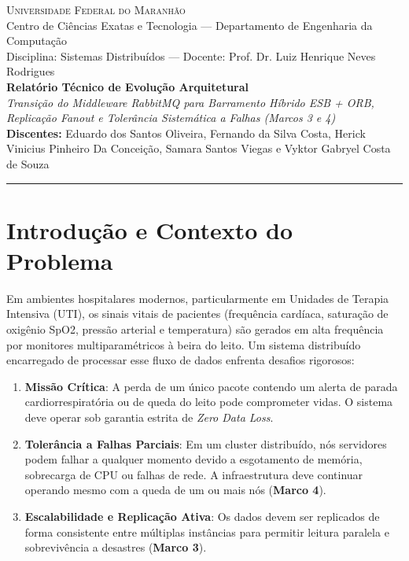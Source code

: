 \documentclass[11pt,a4paper]{article}
\begin{document}
\begin{center}
    {\large \textsc{Universidade Federal do Maranhão}}\\[1pt]
    {\small Centro de Ciências Exatas e Tecnologia — Departamento de Engenharia da Computação}\\[2pt]
    {\small Disciplina: Sistemas Distribuídos — Docente: Prof. Dr. Luiz Henrique Neves Rodrigues}\\[8pt]
    
    {\Large \textbf{Relatório Técnico de Evolução Arquitetural}}\\[3pt]
    {\large \textit{Transição do Middleware RabbitMQ para Barramento Híbrido ESB + ORB, Replicação Fanout e Tolerância Sistemática a Falhas (Marcos 3 e 4)}}\\[6pt]
    
    \textbf{Discentes:} Eduardo dos Santos Oliveira, Fernando da Silva Costa, Herick Vinicius Pinheiro Da Conceição, Samara Santos Viegas e Vyktor Gabryel Costa de Souza\\[6pt]
    \rule{\linewidth}{1pt}
\end{center}

\vspace{-0.2cm}

\section{Introdução e Contexto do Problema}

Em ambientes hospitalares modernos, particularmente em Unidades de Terapia Intensiva (UTI), os sinais vitais de pacientes (frequência cardíaca, saturação de oxigênio SpO2, pressão arterial e temperatura) são gerados em alta frequência por monitores multiparamétricos à beira do leito. Um sistema distribuído encarregado de processar esse fluxo de dados enfrenta desafios rigorosos:

\begin{enumerate}
    \item \textbf{Missão Crítica}: A perda de um único pacote contendo um alerta de parada cardiorrespiratória ou de queda do leito pode comprometer vidas. O sistema deve operar sob garantia estrita de \textit{Zero Data Loss}.
    \item \textbf{Tolerância a Falhas Parciais}: Em um cluster distribuído, nós servidores podem falhar a qualquer momento devido a esgotamento de memória, sobrecarga de CPU ou falhas de rede. A infraestrutura deve continuar operando mesmo com a queda de um ou mais nós (\textbf{Marco 4}).
    \item \textbf{Escalabilidade e Replicação Ativa}: Os dados devem ser replicados de forma consistente entre múltiplas instâncias para permitir leitura paralela e sobrevivência a desastres (\textbf{Marco 3}).
\end{enumerate}
\end{document}
